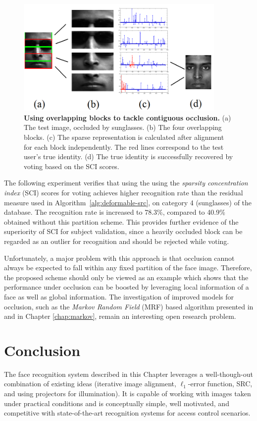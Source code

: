 \begin{figure}
\centering
\includegraphics[width=4in]{figures_pami/occ_block.png}

\caption{\small{\bf Using overlapping blocks to tackle contiguous occlusion.}
(a) The test image, occluded by sunglasses. (b) The four overlapping blocks.
(c) The sparse representation is calculated after alignment for each block
independently. The red lines correspond to the test user's true identity. (d)
The true identity is successfully recovered by voting based on the SCI scores.}
\label{fig:occ-block} 
\end{figure}

The following experiment verifies that using the using the \emph{sparsity
concentration index} (SCI) scores for voting achieves higher recognition rate
than the residual measure used in Algorithm~\ref{alg:deformable-src}, on
category 4 (sunglasses) of the database. The recognition rate is increased to
78.3\%, compared to 40.9\% obtained without this partition scheme. This provides
further evidence of the superiority of SCI for subject validation, since a
heavily occluded block can be regarded as an outlier for recognition and should
be rejected while voting.

Unfortunately, a major problem with this
approach is that occlusion cannot always be expected to fall within
 any fixed partition of the face image. Therefore, the
proposed scheme should only be viewed as an example which shows
that the performance under occlusion can be boosted by
leveraging local information of a face as well as global information. 
The investigation of improved models for occlusion, such as the {\em Markov Random Field} (MRF)
based algorithm presented in \cite{ZhouZ2009} and in Chapter \ref{chap:markov},
remain an interesting open research problem.

\section{Conclusion}\label{sec:conclusion}
The face recognition system described in this Chapter leverages a
well-though-out combination of existing ideas (iterative image alignment,
$\ell_1$-error function, SRC, and using projectors for illumination).  It is
capable of working with images taken under practical conditions and is
conceptually simple, well motivated, and competitive with state-of-the-art
recognition systems for access control scenarios.

